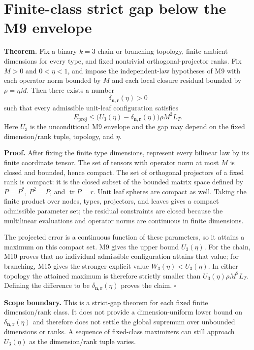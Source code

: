 \section*{Finite-class strict gap below the M9 envelope}
\label{sec:k3-fixed-dimension-compactness-gap}

\textbf{Theorem.} Fix a binary $k=3$ chain or branching topology, finite
ambient dimensions for every type, and fixed nontrivial orthogonal-projector
ranks. Fix $M>0$ and $0<\eta<1$, and impose the independent-law hypotheses
of M9 with each operator norm bounded by $M$ and each local closure residual
bounded by $\rho=\eta M$. Then there exists a number
\[
  \delta_{\mathbf n,\mathbf r}(\eta)>0
\]
such that every admissible unit-leaf configuration satisfies
\[
  E_{\mathrm{proj}}
  \le \bigl(U_3(\eta)-\delta_{\mathbf n,\mathbf r}(\eta)\bigr)
     \rho M^2 L_T.
\]
Here $U_3$ is the unconditional M9 envelope and the gap may depend on the
fixed dimension/rank tuple, topology, and $\eta$.

\textbf{Proof.} After fixing the finite type dimensions, represent every
bilinear law by its finite coordinate tensor. The set of tensors with
operator norm at most $M$ is closed and bounded, hence compact. The set of
orthogonal projectors of a fixed rank is compact: it is the closed subset of
the bounded matrix space defined by $P=P^*$, $P^2=P$, and
$\operatorname{tr}P=r$. Unit leaf spheres are compact as well. Taking the
finite product over nodes, types, projectors, and leaves gives a compact
admissible parameter set; the residual constraints are closed because the
multilinear evaluations and operator norms are continuous in finite
dimensions.

The projected error is a continuous function of these parameters, so it
attains a maximum on this compact set. M9 gives the upper bound $U_3(\eta)$.
For the chain, M10 proves that no individual admissible configuration attains
that value; for branching, M15 gives the stronger explicit value
$W_3(\eta)<U_3(\eta)$. In either topology the attained maximum is therefore
strictly smaller than $U_3(\eta)\rho M^2L_T$. Defining the difference to be
$\delta_{\mathbf n,\mathbf r}(\eta)$ proves the claim. $\square$

\textbf{Scope boundary.} This is a strict-gap theorem for each fixed finite
dimension/rank class. It does not provide a dimension-uniform lower bound on
$\delta_{\mathbf n,\mathbf r}(\eta)$ and therefore does not settle the
global supremum over unbounded dimensions or ranks. A sequence of fixed-class
maximizers can still approach $U_3(\eta)$ as the dimension/rank tuple varies.
